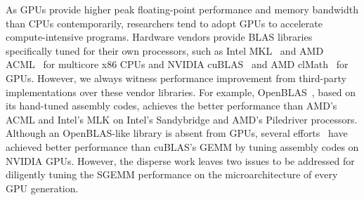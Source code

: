 As GPUs provide higher peak floating-point performance and memory bandwidth than CPUs contemporarily, researchers tend to adopt GPUs to accelerate compute-intensive programs. 
Hardware vendors provide BLAS libraries specifically tuned for their own processors, such as Intel MKL~\cite{intel2007intel} and AMD ACML~\cite{amd2014} for multicore x86 CPUs and NVIDIA cuBLAS~\cite{intel2007intel} and AMD clMath~\cite{clmath} for GPUs. 
However, we always witness performance improvement from third-party implementations over these vendor libraries. 
For example, OpenBLAS~\cite{wang2013augem}, based on its hand-tuned assembly codes, achieves the better performance than AMD's ACML and Intel's MLK on Intel's Sandybridge and AMD's Piledriver processors. %
Although an OpenBLAS-like library is absent from GPUs, several %
efforts~\cite{tan,lai,nervana_sgemm_wiki,
chien, volkov} have achieved better performance than cuBLAS's GEMM by tuning assembly codes on NVIDIA GPUs. 
However, %
the disperse work leaves two issues to be addressed for diligently tuning the SGEMM performance on the microarchitecture of every GPU generation.
